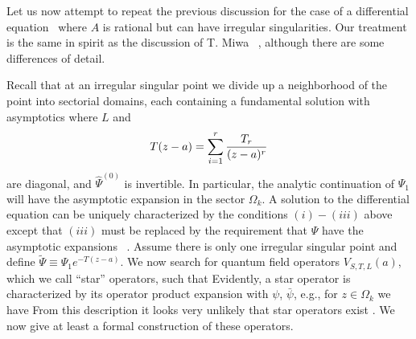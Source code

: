 
Let us now attempt to repeat the 
previous discussion for the case of 
a differential equation \diffl\ where 
$A$ is rational but can have irregular singularities. 
Our treatment is the same in spirit as the discussion of 
T. Miwa \miwai\ , although there are some
differences of detail.

Recall that
at an irregular singular point we divide up a neighborhood 
of the point into sectorial domains, each containing 
a fundamental solution with asymptotics 
\eqn{}
where $L$ and 
$$T(z-a)=\sum_{i=1}^{r}{T_r\over (z-a)^r}$$ 
are diagonal, and $\hat \Psi^{(0)}$ 
is invertible. In 
particular, 
the analytic continuation of $\Psi_1$ will have the asymptotic 
expansion 
\eqn{}
in the sector $\Omega_k$. 
A solution to the differential equation can be uniquely characterized
by the conditions $(i)-(iii)$ above except that $(iii)$ must
be replaced by the requirement that $\Psi$ have the asymptotic
expansions \stoki\ . 
Assume there is only one
irregular singular point and
define $\tilde \Psi\equiv \Psi_1 e^{-T(z-a)}$. 
We now search for quantum 
field operators $V_{S,T,L}(a)$, which we call ``star'' operators,
such that 
\eqn{}
Evidently,
a star operator is characterized by its operator product expansion 
with $\psi$, $\bar\psi$, e.g., for $z\in \Omega_k$ we have
\eqn{}
From this description it looks very unlikely that star operators
exist 
.
We now give at least a formal construction of these operators.

